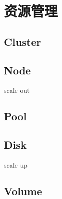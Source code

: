 \chapter{资源管理}

\section{Cluster}

\section{Node}

scale out

\section{Pool}

\section{Disk}

scale up

\section{Volume}
